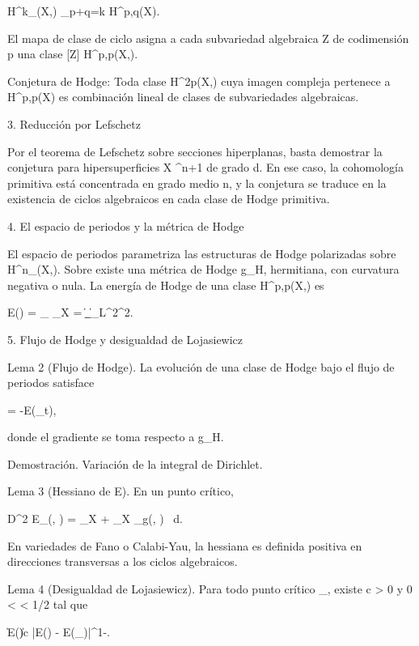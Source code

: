 \documentclass[12pt,a4paper]{book}
\begin{document}
H^k_{}(X,) \cong \bigoplus_{p+q=k} H^{p,q}(X).

El mapa de clase de ciclo asigna a cada subvariedad algebraica Z de codimensión p una clase [Z] \in H^{p,p}(X,).

Conjetura de Hodge: Toda clase \alpha \in H^{2p}(X,) cuya imagen compleja pertenece a H^{p,p}(X) es combinación lineal de clases de subvariedades algebraicas.

3. Reducción por Lefschetz

Por el teorema de Lefschetz sobre secciones hiperplanas, basta demostrar la conjetura para hipersuperficies X \subset {}^{n+1} de grado d. En ese caso, la cohomología primitiva está concentrada en grado medio n, y la conjetura se traduce en la existencia de ciclos algebraicos en cada clase de Hodge primitiva.

4. El espacio de periodos y la métrica de Hodge

El espacio de periodos  parametriza las estructuras de Hodge polarizadas sobre H^n_{}(X,). Sobre  existe una métrica de Hodge g_H, hermitiana, con curvatura negativa o nula. La energía de Hodge de una clase \alpha \in H^{p,p}(X,) es

E(\alpha) = \inf_{\omega \in \alpha} \int_X \omega \wedge * \omega = \|\omega_{}\|_{L^2}^2.

5. Flujo de Hodge y desigualdad de Lojasiewicz

Lema 2 (Flujo de Hodge). La evolución de una clase de Hodge bajo el flujo de periodos satisface

 = -\nabla E(\alpha_t),

donde el gradiente se toma respecto a g_H.

Demostración. Variación de la integral de Dirichlet.

Lema 3 (Hessiano de E). En un punto crítico,

D^2 E_\alpha(\beta, \beta) = \int_X \nabla \beta \wedge * \nabla \beta + \int_X _g(\beta, \beta) \, d.

En variedades de Fano o Calabi-Yau, la hessiana es definida positiva en direcciones transversas a los ciclos algebraicos.

Lema 4 (Desigualdad de Lojasiewicz). Para todo punto crítico \alpha_\infty, existe c > 0 y 0 < \theta < 1/2 tal que

\|\nabla E(\alpha)\| \ge c |E(\alpha) - E(\alpha_\infty)|^{1-\theta}.
\end{document}

